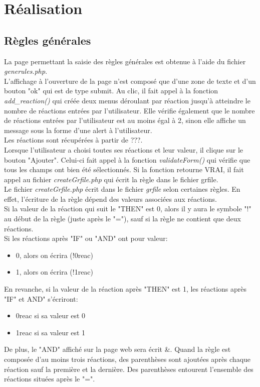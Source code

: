 \chapter{Réalisation}

\section{Règles générales}
La page permettant la saisie des règles générales est obtenue à l'aide du fichier \emph{generules.php}.\\
L'affichage à l'ouverture de la page n'est composé que d'une zone de texte et d'un bouton "ok" qui est de type submit. Au clic, il fait appel à la fonction \emph{add\_reaction()} qui créée deux menus déroulant par réaction jusqu'à atteindre le nombre de réactions entrées par l'utilisateur. Elle vérifie également que le nombre de réactions entrées par l'utilisateur est au moins égal à 2, sinon elle affiche un message sous la forme d'une alert à l'utilisateur.\\
Les réactions sont récupérées à partir de ???.\\

Lorsque l'utilisateur a choisi toutes ses réactions et leur valeur, il clique sur le bouton "Ajouter". Celui-ci fait appel à la fonction \emph{validateForm()} qui vérifie que tous les champs ont bien été sélectionnés. Si la fonction retourne VRAI, il fait appel au fichier \emph{createGrfile.php} qui écrit la règle dans le fichier grfile.\\
Le fichier \emph{createGrfile.php} écrit dans le fichier \emph{grfile} selon certaines règles. En effet, l'écriture de la règle dépend des valeurs associées aux réactions.\\

Si la valeur de la réaction qui suit le "THEN" est 0, alors il y aura le symbole "!" au début de la règle (juste après le "="), sauf si la règle ne contient que deux réactions.\\
Si les réactions après "IF" ou "AND" ont pour valeur:
\begin{itemize}
\item 0, alors on écrira (!0reac)
\item 1, alors on écrira (!1reac)
\end{itemize}
En revanche, si la valeur de la réaction après "THEN" est 1, les réactions après "IF" et AND" s'écriront:
\begin{itemize}
\item 0reac si sa valeur est 0
\item 1reac si sa valeur est 1
\end{itemize}
De plus, le "AND" affiché sur la page web sera écrit \&. Quand la règle est composée d'au moins trois réactions, des parenthèses sont ajoutées après chaque réaction sauf la première et la dernière. Des parenthèses entourent l'ensemble des réactions situées après le "=".\\

